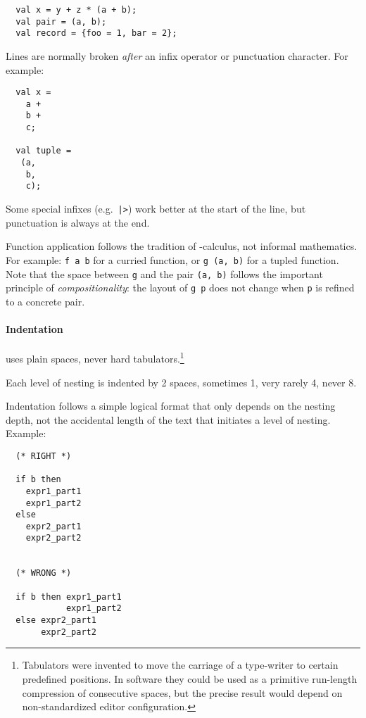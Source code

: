 \begin{isabellebody}
\begin{isamarkuptext}
  \begin{verbatim}
  val x = y + z * (a + b);
  val pair = (a, b);
  val record = {foo = 1, bar = 2};
  \end{verbatim}

  Lines are normally broken \emph{after} an infix operator or
  punctuation character.  For example:

  \begin{verbatim}
  val x =
    a +
    b +
    c;

  val tuple =
   (a,
    b,
    c);
  \end{verbatim}

  Some special infixes (e.g.\ \verb||\verb,|,\verb|>|) work better at the
  start of the line, but punctuation is always at the end.

  Function application follows the tradition of \isa{{\isasymlambda}}-calculus,
  not informal mathematics.  For example: \verb|f a b| for a
  curried function, or \verb|g (a, b)| for a tupled function.
  Note that the space between \verb|g| and the pair \verb|(a, b)| follows the important principle of
  \emph{compositionality}: the layout of \verb|g p| does not
  change when \verb|p| is refined to a concrete pair.

  \paragraph{Indentation} uses plain spaces, never hard
  tabulators.\footnote{Tabulators were invented to move the carriage
  of a type-writer to certain predefined positions.  In software they
  could be used as a primitive run-length compression of consecutive
  spaces, but the precise result would depend on non-standardized
  editor configuration.}

  Each level of nesting is indented by 2 spaces, sometimes 1, very
  rarely 4, never 8.

  Indentation follows a simple logical format that only depends on the
  nesting depth, not the accidental length of the text that initiates
  a level of nesting.  Example:

  \begin{verbatim}
  (* RIGHT *)

  if b then
    expr1_part1
    expr1_part2
  else
    expr2_part1
    expr2_part2


  (* WRONG *)

  if b then expr1_part1
            expr1_part2
  else expr2_part1
       expr2_part2
  \end{verbatim}


\end{isamarkuptext}
\end{isabellebody}
